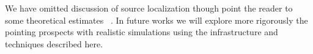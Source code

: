 %
We have omitted discussion of source localization though point
the reader to some theoretical estimates \SNR~\cite{Fairhurst2009}.
In future works we will explore more rigorously the pointing prospects with
realistic simulations using the infrastructure and techniques described here.




